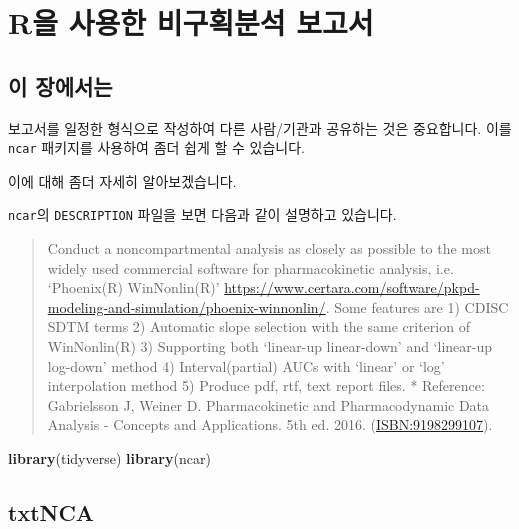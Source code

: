\documentclass[12pt,]{krantz}
\newenvironment{Shaded}{\begin{snugshade}}{\end{snugshade}}
\newcommand{\KeywordTok}[1]{\textcolor[rgb]{0.13,0.29,0.53}{\textbf{#1}}}
\newcommand{\NormalTok}[1]{#1}
\theoremstyle{definition}
\theoremstyle{definition}
\theoremstyle{definition}
\theoremstyle{remark}
\begin{document}
\chapter{R을 사용한 비구획분석 보고서}\label{ncar}

\section{이 장에서는}\label{summary-ncar}

보고서를 일정한 형식으로 작성하여 다른 사람/기관과 공유하는 것은
중요합니다. 이를 \texttt{ncar} 패키지를 사용하여 좀더 쉽게 할 수
있습니다.

이에 대해 좀더 자세히 알아보겠습니다.

\texttt{ncar}의 \texttt{DESCRIPTION} 파일을 보면 다음과 같이 설명하고
있습니다.

\begin{quote}
Conduct a noncompartmental analysis as closely as possible to the most
widely used commercial software for pharmacokinetic analysis, i.e.
`Phoenix(R) WinNonlin(R)'
\url{https://www.certara.com/software/pkpd-modeling-and-simulation/phoenix-winnonlin/}.
Some features are 1) CDISC SDTM terms 2) Automatic slope selection with
the same criterion of WinNonlin(R) 3) Supporting both `linear-up
linear-down' and `linear-up log-down' method 4) Interval(partial) AUCs
with `linear' or `log' interpolation method 5) Produce pdf, rtf, text
report files. * Reference: Gabrielsson J, Weiner D. Pharmacokinetic and
Pharmacodynamic Data Analysis - Concepts and Applications. 5th ed. 2016.
(\url{ISBN:9198299107}).
\end{quote}

\begin{Shaded}
\begin{Highlighting}[]
\KeywordTok{library}\NormalTok{(tidyverse)}
\KeywordTok{library}\NormalTok{(ncar)}
\end{Highlighting}
\end{Shaded}

\section{txtNCA}\label{txtnca}
\end{document}

